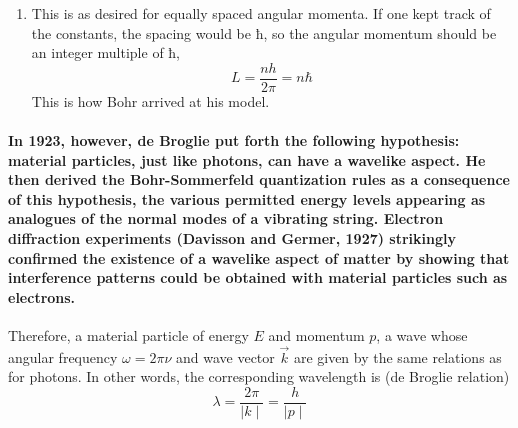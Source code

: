 \documentclass[%
 reprint,
 amsmath,amssymb,
 aps,
]{revtex4-2}
\begin{document}
\begin{enumerate}
  The energy in terms of the angular momentum is then
 \begin{equation}
  E\propto \frac {1}{r}\propto {\frac {1}{L^{2}}}
 \end{equation} 
Assuming, with Bohr, that quantized values of L are equally spaced, the spacing between neighboring energies is
\begin{equation}
  \Delta E\propto {\frac {1}{(L+\hbar )^{2}}}-{\frac {1}{L^{2}}}\approx -{\frac {2\hbar }{L^{3}}}\propto -E^{3/2}
 \end{equation}
\item This is as desired for equally spaced angular momenta. If one kept track of the constants, the spacing would be ħ, so the angular momentum should be an integer multiple of ħ,
\begin{equation}
  L={\frac {nh}{2\pi}}=n\hbar 
 \end{equation}
This is how Bohr arrived at his model. 
\end{enumerate}
\paragraph{In 1923, however, de Broglie put forth the following hypothesis: material particles, just like photons, can have a wavelike aspect. He then derived the Bohr-Sommerfeld quantization rules as a consequence of this hypothesis, the various permitted energy levels appearing as analogues of the normal modes of a vibrating string. Electron diffraction experiments (Davisson and Germer, 1927) strikingly confirmed the existence of a wavelike aspect of matter by showing that interference patterns could be obtained with material particles such as electrons.}
Therefore, a material particle of energy $E$ and momentum $p$, a wave whose angular frequency $\omega = 2\pi\nu$ and wave vector $\overrightarrow{k}$ are given by the same relations as for photons. In other words, the corresponding wavelength is (de Broglie relation)
\begin{equation}
\lambda =\frac{2\pi}{\mid k\mid}=\frac{h}{\mid p\mid}
\end{equation}
\end{document}
